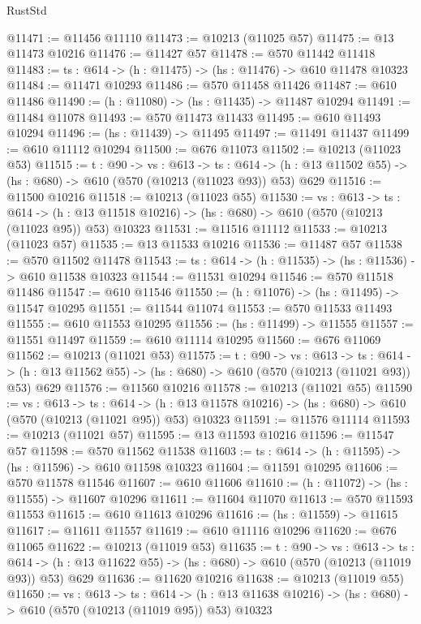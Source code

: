\begin{lexlean}{RustStd}
\begin{coremodule}
@11471 := @11456 @11110
@11473 := @10213 (@11025 @57)
@11475 := @13 @11473 @10216
@11476 := @11427 @57
@11478 := @570 @11442 @11418
@11483 := {ts : @614} -> (h : @11475) -> (hs : @11476) -> @610 @11478 @10323
@11484 := @11471 @10293
@11486 := @570 @11458 @11426
@11487 := @610 @11486
@11490 := (h : @11080) -> (hs : @11435) -> @11487 @10294
@11491 := @11484 @11078
@11493 := @570 @11473 @11433
@11495 := @610 @11493 @10294
@11496 := (hs : @11439) -> @11495
@11497 := @11491 @11437
@11499 := @610 @11112 @10294
@11500 := @676 @11073
@11502 := @10213 (@11023 @53)
@11515 := {t : @90} ->
  {vs : @613} ->
  {ts : @614} -> (h : @13 @11502 @55) -> (hs : @680) -> @610 (@570 (@10213 (@11023 @93)) @53) @629
@11516 := @11500 @10216
@11518 := @10213 (@11023 @55)
@11530 := {vs : @613} ->
  {ts : @614} ->
  (h : @13 @11518 @10216) -> (hs : @680) -> @610 (@570 (@10213 (@11023 @95)) @53) @10323
@11531 := @11516 @11112
@11533 := @10213 (@11023 @57)
@11535 := @13 @11533 @10216
@11536 := @11487 @57
@11538 := @570 @11502 @11478
@11543 := {ts : @614} -> (h : @11535) -> (hs : @11536) -> @610 @11538 @10323
@11544 := @11531 @10294
@11546 := @570 @11518 @11486
@11547 := @610 @11546
@11550 := (h : @11076) -> (hs : @11495) -> @11547 @10295
@11551 := @11544 @11074
@11553 := @570 @11533 @11493
@11555 := @610 @11553 @10295
@11556 := (hs : @11499) -> @11555
@11557 := @11551 @11497
@11559 := @610 @11114 @10295
@11560 := @676 @11069
@11562 := @10213 (@11021 @53)
@11575 := {t : @90} ->
  {vs : @613} ->
  {ts : @614} -> (h : @13 @11562 @55) -> (hs : @680) -> @610 (@570 (@10213 (@11021 @93)) @53) @629
@11576 := @11560 @10216
@11578 := @10213 (@11021 @55)
@11590 := {vs : @613} ->
  {ts : @614} ->
  (h : @13 @11578 @10216) -> (hs : @680) -> @610 (@570 (@10213 (@11021 @95)) @53) @10323
@11591 := @11576 @11114
@11593 := @10213 (@11021 @57)
@11595 := @13 @11593 @10216
@11596 := @11547 @57
@11598 := @570 @11562 @11538
@11603 := {ts : @614} -> (h : @11595) -> (hs : @11596) -> @610 @11598 @10323
@11604 := @11591 @10295
@11606 := @570 @11578 @11546
@11607 := @610 @11606
@11610 := (h : @11072) -> (hs : @11555) -> @11607 @10296
@11611 := @11604 @11070
@11613 := @570 @11593 @11553
@11615 := @610 @11613 @10296
@11616 := (hs : @11559) -> @11615
@11617 := @11611 @11557
@11619 := @610 @11116 @10296
@11620 := @676 @11065
@11622 := @10213 (@11019 @53)
@11635 := {t : @90} ->
  {vs : @613} ->
  {ts : @614} -> (h : @13 @11622 @55) -> (hs : @680) -> @610 (@570 (@10213 (@11019 @93)) @53) @629
@11636 := @11620 @10216
@11638 := @10213 (@11019 @55)
@11650 := {vs : @613} ->
  {ts : @614} ->
  (h : @13 @11638 @10216) -> (hs : @680) -> @610 (@570 (@10213 (@11019 @95)) @53) @10323

\end{coremodule}
\end{lexlean}
